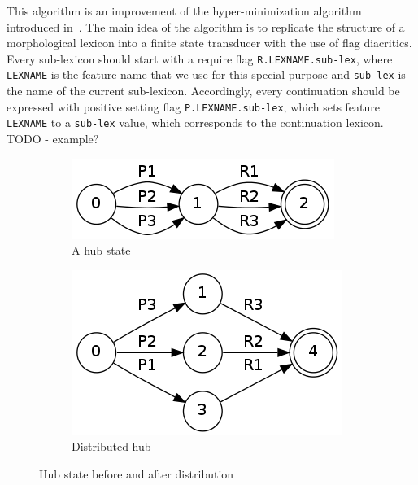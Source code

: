 \documentclass[11pt]{article}
\begin{document}
This algorithm is an improvement of the hyper-minimization algorithm introduced in~. The main idea of the algorithm is to 
replicate the structure of a morphological lexicon into a finite state transducer with the use of flag diacritics. Every sub-lexicon should start 
with a require flag \verb+R.LEXNAME.sub-lex+, where \verb+LEXNAME+ is the feature name that we use for this special purpose
and \verb+sub-lex+ is the name of the current sub-lexicon. Accordingly, every continuation should be expressed with positive setting flag 
\verb+P.LEXNAME.sub-lex+, which sets feature \verb+LEXNAME+ to a \verb+sub-lex+ value, which corresponds to the continuation lexicon.
TODO - example?

\begin{figure}
\centering
\begin{subfigure}[b]{0.4\textwidth}
        \includegraphics[width=\textwidth]{hub.png}
        \caption{A hub state}
        \label{fig:hub}
\end{subfigure}%
\quad %
\begin{subfigure}[b]{0.4\textwidth}
        \includegraphics[width=\textwidth]{distr.png}
        \caption{Distributed hub}
        \label{fig:distr}
\end{subfigure}
\caption{Hub state before and after distribution}
\label{fig:hub_distr}
\end{figure}
\end{document}
